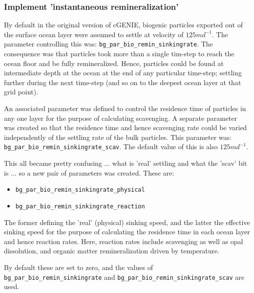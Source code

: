\documentclass[11pt,fleqn]{book} %
\begin{document}
\hfill \break

\subsubsection{Implement 'instantaneous remineralization'}
\vspace{1mm}

By default in the original version of cGENIE, biogenic particles exported out of the surface ocean layer were assumed to settle at velocity of \(125md^{-1}\). The parameter controlling this was: \break\texttt{bg\_par\_bio\_remin\_sinkingrate}. The consequence was that particles took more than a single tim-step to reach the ocean floor and be fully remineralized. Hence, particles could be found at intermediate depth at the ocean at the end of any particular time-step; settling further during the next time-step (and so on to the deepest ocean layer at that grid point).

An associated parameter was defined to control the residence time of particles in any one layer for the purpose of calculating scavenging. A separate parameter was created so that the residence time and hence scavenging rate could be varied independently of the settling rate of the bulk particles. This parameter was: \texttt{bg\_par\_bio\_remin\_sinkingrate\_scav}. The default value of this is also \(125md^{-1}\).

This all became pretty confusing ... what is 'real' settling and what the 'scav' bit is ... so a new pair of parameters was created. These are:
\vspace{1mm}
\begin{itemize}[noitemsep]
\item \texttt{bg\_par\_bio\_remin\_sinkingrate\_physical}
\item \texttt{bg\_par\_bio\_remin\_sinkingrate\_reaction}
\end{itemize}
\vspace{1mm}
The former defining the 'real' (physical) sinking speed, and the latter the effective sinking speed for the purpose of calculating the residence time in each ocean layer and hence reaction rates. Here, reaction rates include scavenging as well as opal dissolution, and organic matter remineralization driven by temperature.

By default these are set to zero, and the values of \texttt{bg\_par\_bio\_remin\_sinkingrate} and \texttt{bg\_par\_bio\_remin\_sinkingrate\_scav} are used. 
\end{document}
